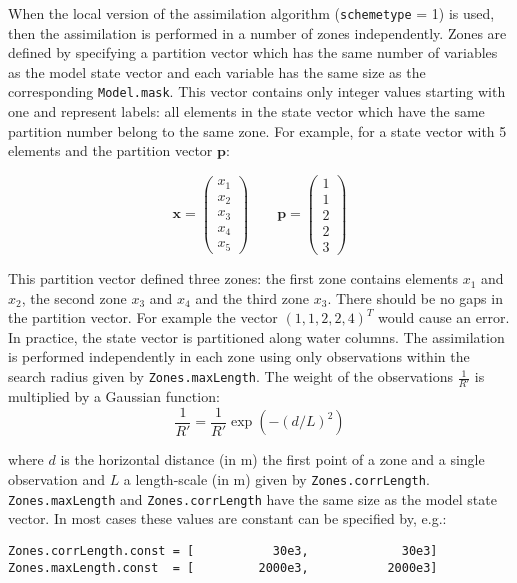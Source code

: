 \documentclass[a4paper,12pt]{article}
\newcommand{\code}{\texttt}
\begin{document}
When the local version of the assimilation algorithm (\code{schemetype} = 1) is used, then the assimilation is performed in a number of zones independently. Zones are defined by specifying a partition vector which has the same number of variables as the model state vector and each variable has the same size as the corresponding \code{Model.mask}. This vector contains only integer values starting with one and represent labels: all elements in the state vector which have the same partition number belong to the same zone. For example, for a state vector with 5 elements and the partition vector $\mathbf p$:

\begin{equation}
\mathbf x = 
\left( 
\begin{array}{c}
x_1 \\
x_2 \\
x_3 \\
x_4 \\
x_5
\end{array}
\right) 
\qquad
\mathbf p = 
\left( 
\begin{array}{c}
1 \\
1 \\
2 \\
2 \\
3
\end{array}
\right) 
\end{equation}

This partition vector defined three zones: the first zone contains elements $x_1$ and $x_2$, the second zone $x_3$ and $x_4$ and the third zone $x_3$. There should be no gaps in the partition vector. For example the vector $(1,1,2,2,4)^T$ would cause an error. 
In practice, the state vector is partitioned along water columns.
The assimilation is performed independently in each zone using only observations within the search radius given by 
\code{Zones.maxLength}. The weight of the observations $\frac{1}{R'}$ is multiplied by a Gaussian function:
\begin{equation}
\frac{1}{R'} = \frac{1}{R'} \exp(- (d/L)^2)
\end{equation}

where $d$ is the horizontal distance (in m) the first point of a zone and a single observation and $L$ a length-scale (in m) given by \code{Zones.corrLength}. \code{Zones.maxLength} and \code{Zones.corrLength} have the same size as the model state vector. In most cases these values are constant can be specified by, e.g.:

\begin{verbatim} 
Zones.corrLength.const = [           30e3,             30e3]
Zones.maxLength.const  = [         2000e3,           2000e3]
\end{verbatim}
\end{document}
